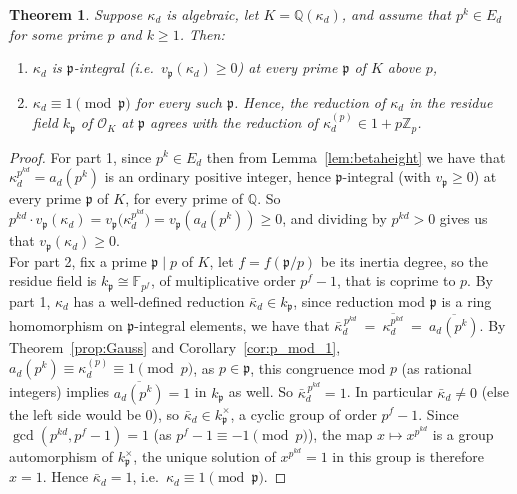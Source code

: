 \documentclass{article}
\theoremstyle{plain}
\newtheorem{theorem}{Theorem}[section]
\theoremstyle{definition}
\theoremstyle{remark}
\newcommand{\Q}{\mathbb{Q}}
\newcommand{\F}{\mathbb{F}}
\newcommand{\Zp}{\mathbb{Z}_p}
\begin{document}
\begin{theorem}\label{thm:localrigidity}
Suppose $\kappa_d$ is algebraic, let $K=\Q(\kappa_d)$, and assume that $p^k\in E_d$ for some prime $p$ and $k\ge1$. Then:
\begin{enumerate}
\item $\kappa_d$ is $\mathfrak p$-integral (i.e.\ $v_{\mathfrak p}(\kappa_d)\ge0$) at every prime $\mathfrak p$ of $K$ above $p$,
\item $\kappa_d\equiv1\pmod{\mathfrak p}$ for every such $\mathfrak p$. Hence, the reduction of $\kappa_d$ in the residue field $k_\mathfrak{p}$ of  $\mathcal{O}_K$ at $\mathfrak{p}$ agrees with the reduction of $\kappa_d^{(p)}\in1+p\Zp$.
\end{enumerate}
\end{theorem}
\begin{proof}
For part 1, since $p^k\in E_d$ then from Lemma~\ref{lem:betaheight} we have that $\kappa_d^{p^{kd}}=a_d(p^k)$ is an ordinary positive integer, hence $\mathfrak p$-integral (with $v_{\mathfrak p}\ge0$) at every prime $\mathfrak p$ of $K$, for every prime of $\mathbb{Q}$. So $p^{kd}\cdot v_{\mathfrak p}(\kappa_d)=v_{\mathfrak p}\big(\kappa_d^{p^{kd}}\big)=v_{\mathfrak p}(a_d(p^k))\ge0$, and dividing by $p^{kd}>0$ gives us that $v_{\mathfrak p}(\kappa_d)\ge0$.\\

For part 2, fix a prime $\mathfrak p\mid p$ of $K$, let $f=f(\mathfrak p/p)$ be its inertia degree, so the residue field is $ k_\mathfrak{p}\cong\F_{p^f}$, of multiplicative order $p^f-1$, that is coprime to $p$. By part 1, $\kappa_d$ has a well-defined reduction $\bar\kappa_d\in k_\mathfrak{p}$, since reduction mod $\mathfrak p$ is a ring homomorphism on $\mathfrak p$-integral elements, we have that $\bar\kappa_d^{\,p^{kd}}\ =\ \overline{\kappa_d^{p^{kd}}}\ =\ \overline{a_d(p^k)}$. By Theorem~\ref{prop:Gauss} and Corollary~\ref{cor:p_mod_1}, $a_d(p^k)\equiv\kappa_d^{(p)}\equiv1\pmod p$, as $p\in\mathfrak p$, this congruence mod $p$ (as rational integers) implies $\overline{a_d(p^k)}=1$ in $ k_\mathfrak{p}$ as well. So $\bar\kappa_d^{\,p^{kd}}=1$. In particular $\bar\kappa_d\ne0$ (else the left side would be $0$), so $\bar\kappa_d\in k_{\mathfrak p}^\times$, a cyclic group of order $p^f-1$. Since $\gcd(p^{kd},p^f-1)=1$ (as $p^f-1\equiv-1\pmod p$), the map $x\mapsto x^{p^{kd}}$ is a group automorphism of $k_{\mathfrak p}^\times$, the unique solution of $x^{p^{kd}}=1$ in this group is therefore $x=1$. Hence $\bar\kappa_d=1$, i.e.\ $\kappa_d\equiv1\pmod{\mathfrak p}$.
\end{proof}
\end{document}
